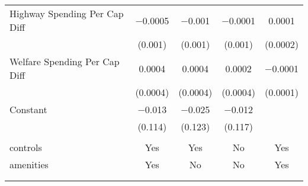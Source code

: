 \begin{table}[!htbp]
\begin{tabular}{@{\extracolsep{5pt}}lcccc}
  Highway Spending Per Cap Diff & $-$0.0005 & $-$0.001 & $-$0.0001 & 0.0001 \\ 
  & (0.001) & (0.001) & (0.001) & (0.0002) \\ 
  Welfare Spending Per Cap Diff & 0.0004 & 0.0004 & 0.0002 & $-$0.0001 \\ 
  & (0.0004) & (0.0004) & (0.0004) & (0.0001) \\ 
  Constant & $-$0.013 & $-$0.025 & $-$0.012 &  \\ 
  & (0.114) & (0.123) & (0.117) &  \\ 
 \hline \\[-1.8ex] 
controls & Yes & Yes & No & Yes \\ 
amenities & Yes & No & No & Yes \\ 
\hline \\[-1.8ex] 
\hline 
\hline \\[-1.8ex] 
\end{tabular} 
\end{table} 
